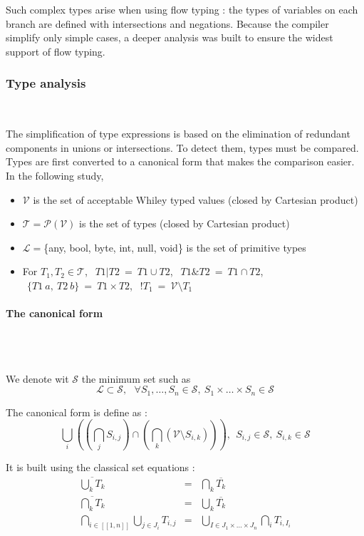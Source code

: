 \documentclass[10pt,a4paper]{article}
\renewcommand{\indent}{~\\\vspace{-.8cm}}
\newcommand{\val}{\mathcal V}
\newcommand{\typ}{\mathcal T}
\newcommand{\lea}{\mathcal L}
\begin{document}
Such complex types arise when using flow typing : the types of variables on each branch are defined with intersections and negations. Because the compiler simplify only simple cases, a deeper analysis was built to ensure the  widest support of flow typing.


\subsubsection{Type analysis}
\indent


The simplification of type expressions is based on the elimination of redundant components in unions or intersections. To detect them, types must be compared. Types are first converted to a canonical form that makes the comparison easier.\\


In the following study,
\begin{itemize}
	\item $\val$ is the set of acceptable Whiley typed values (closed by Cartesian product)
	\item $\typ = \mathcal P (\val)$ is the set of types (closed by Cartesian product)
	\item $\lea = $\{any, bool, byte, int, null, void\} is the set of primitive types
	\item For $T_1,T_2 \in \typ$, $~~T1|T2~=~T1 \cup T2$, $~~T1\&T2~=~T1 \cap T2$, $~~\{T1~a,~T2~b\}~=~T1 \times T2$, $~~!T_1~=~\val \setminus T_1$
\end{itemize}

\paragraph{The canonical form}~\\\indent

We denote wit $\mathcal S$ the minimum set such as
\[ \lea \subset \mathcal S, ~~~ \forall S_1,\ldots,S_n \in \mathcal S,~  S_1 \times \ldots \times S_n \in \mathcal S\]

The canonical form is define as :
\[
\bigcup_i \left(\left( \bigcap_j S_{i,j}\right) \cap \left( \bigcap_k \left(\val \setminus S_{i,k}\right) \right)\right), ~~ S_{i,j} \in \mathcal S, ~ S_{i,k} \in \mathcal S
\]


It is built using the classical set equations :
\[
\begin{array}{rcl}
	\overline{\bigcup _k T_k} & = & \bigcap _k \overline{T_k} \\
	\overline{\bigcap _k T_k} & = & \bigcup _k \overline{T_k} \\
	\bigcap _{i \in  [ \! [ 1,n ] \! ] } \bigcup _{j \in J_i} T_{i,j} & = & \bigcup _{I \in J_1\times\ldots\times J_n} \bigcap _i T_{i, I_i}
\end{array}
\]
\end{document}
